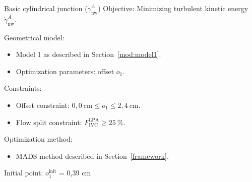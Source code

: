 \begin{optimproblem}{Basic cylindrical junction ($\dot{\gamma}^{A}_{\text{nw}}$)}
	\vspace{2mm}
	Objective: Minimizing turbulent kinetic energy $\dot{\gamma}^{A}_{\text{nw}}$.
	
	\vspace{2mm}
	Geometrical model:
	\begin{itemize}
		\item Model 1 as described in Section~\ref{mod:model1}.
		\item Optimization parameters: offset $o_1$.
	\end{itemize}
	Constraints:
	\begin{itemize}
		\item Offset constraint: $0{,}0~\text{cm} \leq o_1 \leq 2{,}4~\text{cm}$.
		\item Flow split constraint: $F^{\text{LPA}}_{\text{IVC}} \geq 25~\%$.
	\end{itemize}
	Optimization method:
	\begin{itemize}
		\item MADS method described in Section~\ref{framework}.
	\end{itemize}
	Initial point: $o^{\text{init}}_{1}$ = 0{,}39 cm
	\label{optimprob:3}
\end{optimproblem}

